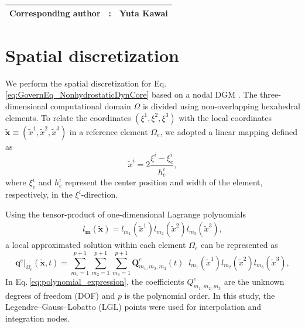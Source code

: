 {\bf \Large
\begin{tabular}{ccc}
\hline
  Corresponding author & : & Yuta Kawai\\
\hline
\end{tabular}
}

\section{Spatial discretization}\label{sec:dynamics_spatial_discretization}
We perform the spatial discretization for Eq.\,\eqref{eq:GovernEq_NonhydrostaticDynCore}
based on a nodal DGM \citep[e.g.,][]{hesthaven2007nodal}. 
The three-dimensional computational domain $\Omega$ is divided 
using non-overlapping hexahedral elements. 
To relate the coordinates $(\xi^1,\xi^2, \xi^3)$ with the local coordinates 
$\tilde{\bm{x}} \equiv (\tilde{x}^1,\tilde{x}^2,\tilde{x}^3)$ 
in a reference element $\Omega_e$, 
we adopted a linear mapping defined as 
\begin{equation}
 \tilde{x}^i = 2\dfrac{\xi^i-\xi^i_e}{h^i_{e}}, 
\label{eq:linear_mapping}
\end{equation}
where 
$\xi^i_{e}$ and $h^i_e$ represent the center position and width of the element, respectively, in the $\xi^i$-direction. 


Using the tensor-product of one-dimensional Lagrange polynomials 
\begin{align}
 l_{\bm{m}} (\tilde{\bm{x}}) = l_{m_1}(\tilde{x}^1) l_{m_2}(\tilde{x}^2) l_{m_3} (\tilde{x}^3),   
\end{align}
a local approximated solution within each element $\Omega_e$ can be represented as
\begin{equation}
  \bm{q}^e|_{\Omega_e} (\tilde{\bm{x}},t) 
  = \sum_{m_1=1}^{p+1} \sum_{m_2=1}^{p+1} \sum_{m_3=1}^{p+1} 
      \bm{Q}^e_{m_1,m_2,m_3} (t) \;\; l_{m_1}(\tilde{x}^1) l_{m_2}(\tilde{x}^2) l_{m_3} (\tilde{x}^3), 
\label{eq:polynomial_expression}
\end{equation}
In Eq.\,\eqref{eq:polynomial_expression}, 
the coefficients $Q^e_{m_1,m_2,m_3}$ are the unknown degrees of freedom (DOF) 
and $p$ is the polynomial order.
In this study, the  Legendre--Gauss--Lobatto (LGL) points were used for interpolation and integration nodes. 


